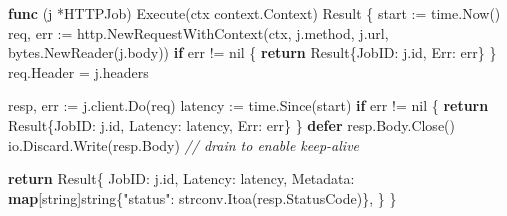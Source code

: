 \documentclass[
]{article}
\newenvironment{Shaded}{}{}
\newcommand{\CommentTok}[1]{\textcolor[rgb]{0.38,0.63,0.69}{\textit{#1}}}
\newcommand{\ControlFlowTok}[1]{\textcolor[rgb]{0.00,0.44,0.13}{\textbf{#1}}}
\newcommand{\DataTypeTok}[1]{\textcolor[rgb]{0.56,0.13,0.00}{#1}}
\newcommand{\KeywordTok}[1]{\textcolor[rgb]{0.00,0.44,0.13}{\textbf{#1}}}
\newcommand{\NormalTok}[1]{#1}
\newcommand{\OperatorTok}[1]{\textcolor[rgb]{0.40,0.40,0.40}{#1}}
\newcommand{\OtherTok}[1]{\textcolor[rgb]{0.00,0.44,0.13}{#1}}
\newcommand{\StringTok}[1]{\textcolor[rgb]{0.25,0.44,0.63}{#1}}
\begin{document}
\begin{Shaded}
\begin{Highlighting}[]
\KeywordTok{func} \OperatorTok{(}\NormalTok{j }\OperatorTok{*}\NormalTok{HTTPJob}\OperatorTok{)}\NormalTok{ Execute}\OperatorTok{(}\NormalTok{ctx context}\OperatorTok{.}\NormalTok{Context}\OperatorTok{)}\NormalTok{ Result }\OperatorTok{\{}
\NormalTok{    start }\OperatorTok{:=}\NormalTok{ time}\OperatorTok{.}\NormalTok{Now}\OperatorTok{()}
\NormalTok{    req}\OperatorTok{,}\NormalTok{ err }\OperatorTok{:=}\NormalTok{ http}\OperatorTok{.}\NormalTok{NewRequestWithContext}\OperatorTok{(}\NormalTok{ctx}\OperatorTok{,}\NormalTok{ j}\OperatorTok{.}\NormalTok{method}\OperatorTok{,}\NormalTok{ j}\OperatorTok{.}\NormalTok{url}\OperatorTok{,}\NormalTok{ bytes}\OperatorTok{.}\NormalTok{NewReader}\OperatorTok{(}\NormalTok{j}\OperatorTok{.}\NormalTok{body}\OperatorTok{))}
    \ControlFlowTok{if}\NormalTok{ err }\OperatorTok{!=} \OtherTok{nil} \OperatorTok{\{}
        \ControlFlowTok{return}\NormalTok{ Result}\OperatorTok{\{}\NormalTok{JobID}\OperatorTok{:}\NormalTok{ j}\OperatorTok{.}\NormalTok{id}\OperatorTok{,}\NormalTok{ Err}\OperatorTok{:}\NormalTok{ err}\OperatorTok{\}}
    \OperatorTok{\}}
\NormalTok{    req}\OperatorTok{.}\NormalTok{Header }\OperatorTok{=}\NormalTok{ j}\OperatorTok{.}\NormalTok{headers}

\NormalTok{    resp}\OperatorTok{,}\NormalTok{ err }\OperatorTok{:=}\NormalTok{ j}\OperatorTok{.}\NormalTok{client}\OperatorTok{.}\NormalTok{Do}\OperatorTok{(}\NormalTok{req}\OperatorTok{)}
\NormalTok{    latency }\OperatorTok{:=}\NormalTok{ time}\OperatorTok{.}\NormalTok{Since}\OperatorTok{(}\NormalTok{start}\OperatorTok{)}
    \ControlFlowTok{if}\NormalTok{ err }\OperatorTok{!=} \OtherTok{nil} \OperatorTok{\{}
        \ControlFlowTok{return}\NormalTok{ Result}\OperatorTok{\{}\NormalTok{JobID}\OperatorTok{:}\NormalTok{ j}\OperatorTok{.}\NormalTok{id}\OperatorTok{,}\NormalTok{ Latency}\OperatorTok{:}\NormalTok{ latency}\OperatorTok{,}\NormalTok{ Err}\OperatorTok{:}\NormalTok{ err}\OperatorTok{\}}
    \OperatorTok{\}}
    \ControlFlowTok{defer}\NormalTok{ resp}\OperatorTok{.}\NormalTok{Body}\OperatorTok{.}\NormalTok{Close}\OperatorTok{()}
\NormalTok{    io}\OperatorTok{.}\NormalTok{Discard}\OperatorTok{.}\NormalTok{Write}\OperatorTok{(}\NormalTok{resp}\OperatorTok{.}\NormalTok{Body}\OperatorTok{)} \CommentTok{// drain to enable keep{-}alive}

    \ControlFlowTok{return}\NormalTok{ Result}\OperatorTok{\{}
\NormalTok{        JobID}\OperatorTok{:}\NormalTok{    j}\OperatorTok{.}\NormalTok{id}\OperatorTok{,}
\NormalTok{        Latency}\OperatorTok{:}\NormalTok{  latency}\OperatorTok{,}
\NormalTok{        Metadata}\OperatorTok{:} \KeywordTok{map}\OperatorTok{[}\DataTypeTok{string}\OperatorTok{]}\DataTypeTok{string}\OperatorTok{\{}\StringTok{"status"}\OperatorTok{:}\NormalTok{ strconv}\OperatorTok{.}\NormalTok{Itoa}\OperatorTok{(}\NormalTok{resp}\OperatorTok{.}\NormalTok{StatusCode}\OperatorTok{)\},}
    \OperatorTok{\}}
\OperatorTok{\}}
\end{Highlighting}
\end{Shaded}
\end{document}
